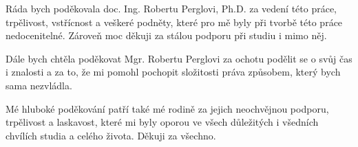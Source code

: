 \documentclass[czech,bachelor,unicode,oneside]{ctufit-thesis}
\begin{document}
\frontmatter\frontmatterinit %

\thispagestyle{empty}\maketitle\thispagestyle{empty}\cleardoublepage %


\imprintpage %
\stopTOCentries

\begin{acknowledgmentpage}
  \setlength{\parindent}{0pt}
  \setlength{\parskip}{\baselineskip}

  Ráda bych poděkovala doc. Ing. Robertu Perglovi, Ph.D. za vedení této
  práce, trpělivost, vstřícnost a veškeré podněty, které pro mě byly při tvorbě této práce nedocenitelné. Zároveň moc děkuji za stálou podporu při studiu i mimo něj.

  Dále bych chtěla poděkovat Mgr. Robertu Perglovi za ochotu podělit se o svůj čas i znalosti a za to, že mi pomohl pochopit složitosti práva způsobem, který bych sama nezvládla. 

  Mé hluboké poděkování patří také mé rodině za jejich neochvějnou podporu,
  trpělivost a laskavost, které mi byly oporou ve všech důležitých i všedních
  chvílích studia a celého života. Děkuji za všechno. 
\end{acknowledgmentpage}

\end{document}
